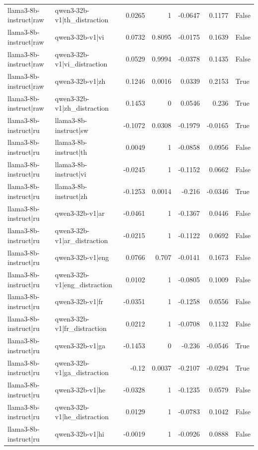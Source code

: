 \begin{table}
\begin{tabular}{l l r r r r l}
llama3-8b-instruct|raw & qwen3-32b-v1|th_distraction & 0.0265 & 1 & -0.0647 & 0.1177 & False \\
llama3-8b-instruct|raw & qwen3-32b-v1|vi & 0.0732 & 0.8095 & -0.0175 & 0.1639 & False \\
llama3-8b-instruct|raw & qwen3-32b-v1|vi_distraction & 0.0529 & 0.9994 & -0.0378 & 0.1435 & False \\
llama3-8b-instruct|raw & qwen3-32b-v1|zh & 0.1246 & 0.0016 & 0.0339 & 0.2153 & True \\
llama3-8b-instruct|raw & qwen3-32b-v1|zh_distraction & 0.1453 & 0 & 0.0546 & 0.236 & True \\
llama3-8b-instruct|ru & llama3-8b-instruct|sw & -0.1072 & 0.0308 & -0.1979 & -0.0165 & True \\
llama3-8b-instruct|ru & llama3-8b-instruct|th & 0.0049 & 1 & -0.0858 & 0.0956 & False \\
llama3-8b-instruct|ru & llama3-8b-instruct|vi & -0.0245 & 1 & -0.1152 & 0.0662 & False \\
llama3-8b-instruct|ru & llama3-8b-instruct|zh & -0.1253 & 0.0014 & -0.216 & -0.0346 & True \\
llama3-8b-instruct|ru & qwen3-32b-v1|ar & -0.0461 & 1 & -0.1367 & 0.0446 & False \\
llama3-8b-instruct|ru & qwen3-32b-v1|ar_distraction & -0.0215 & 1 & -0.1122 & 0.0692 & False \\
llama3-8b-instruct|ru & qwen3-32b-v1|eng & 0.0766 & 0.707 & -0.0141 & 0.1673 & False \\
llama3-8b-instruct|ru & qwen3-32b-v1|eng_distraction & 0.0102 & 1 & -0.0805 & 0.1009 & False \\
llama3-8b-instruct|ru & qwen3-32b-v1|fr & -0.0351 & 1 & -0.1258 & 0.0556 & False \\
llama3-8b-instruct|ru & qwen3-32b-v1|fr_distraction & 0.0212 & 1 & -0.0708 & 0.1132 & False \\
llama3-8b-instruct|ru & qwen3-32b-v1|ga & -0.1453 & 0 & -0.236 & -0.0546 & True \\
llama3-8b-instruct|ru & qwen3-32b-v1|ga_distraction & -0.12 & 0.0037 & -0.2107 & -0.0294 & True \\
llama3-8b-instruct|ru & qwen3-32b-v1|he & -0.0328 & 1 & -0.1235 & 0.0579 & False \\
llama3-8b-instruct|ru & qwen3-32b-v1|he_distraction & 0.0129 & 1 & -0.0783 & 0.1042 & False \\
llama3-8b-instruct|ru & qwen3-32b-v1|hi & -0.0019 & 1 & -0.0926 & 0.0888 & False \\

\end{tabular}
\end{table}
